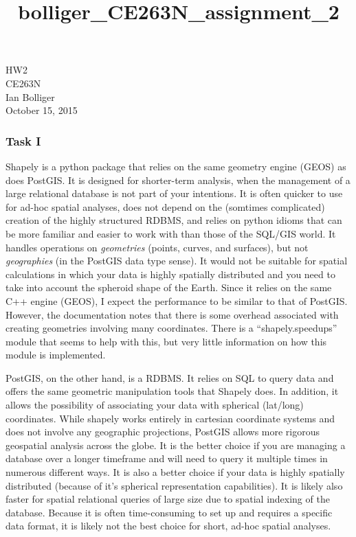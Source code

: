 \documentclass{article}
\title{bolliger\_CE263N\_assignment\_2}
\begin{document}
    
    
    \maketitle
    
    

    
    HW2\\
CE263N\\
Ian Bolliger\\
October 15, 2015

    \subsubsection{Task I}\label{task-i}

    Shapely is a python package that relies on the same geometry engine
(GEOS) as does PostGIS. It is designed for shorter-term analysis, when
the management of a large relational database is not part of your
intentions. It is often quicker to use for ad-hoc spatial analyses, does
not depend on the (somtimes complicated) creation of the highly
structured RDBMS, and relies on python idioms that can be more familiar
and easier to work with than those of the SQL/GIS world. It handles
operations on \emph{geometries} (points, curves, and surfaces), but not
\emph{geographies} (in the PostGIS data type sense). It would not be
suitable for spatial calculations in which your data is highly spatially
distributed and you need to take into account the spheroid shape of the
Earth. Since it relies on the same C++ engine (GEOS), I expect the
performance to be similar to that of PostGIS. However, the documentation
notes that there is some overhead associated with creating geometries
involving many coordinates. There is a ``shapely.speedups'' module that
seems to help with this, but very little information on how this module
is implemented.

PostGIS, on the other hand, is a RDBMS. It relies on SQL to query data
and offers the same geometric manipulation tools that Shapely does. In
addition, it allows the possibility of associating your data with
spherical (lat/long) coordinates. While shapely works entirely in
cartesian coordinate systems and does not involve any geographic
projections, PostGIS allows more rigorous geospatial analysis across the
globe. It is the better choice if you are managing a database over a
longer timeframe and will need to query it multiple times in numerous
different ways. It is also a better choice if your data is highly
spatially distributed (because of it's spherical representation
capabilities). It is likely also faster for spatial relational queries
of large size due to spatial indexing of the database. Because it is
often time-consuming to set up and requires a specific data format, it
is likely not the best choice for short, ad-hoc spatial analyses.
\end{document}
